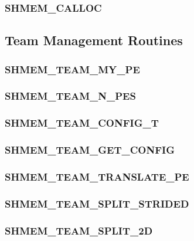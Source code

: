 \documentclass[10pt]{book}
\begin{document}
\subsubsection{\textbf{SHMEM\_CALLOC}}\label{subsec:shmem_calloc}




\subsection{Team Management Routines}\label{subsec:team}


\subsubsection{\textbf{SHMEM\_TEAM\_MY\_PE}}\label{subsec:shmem_team_my_pe}


\subsubsection{\textbf{SHMEM\_TEAM\_N\_PES}}\label{subsec:shmem_team_n_pes}


\subsubsection{\textbf{SHMEM\_TEAM\_CONFIG\_T}}
\label{subsec:shmem_team_config_t}


\subsubsection{\textbf{SHMEM\_TEAM\_GET\_CONFIG}}\label{subsec:shmem_team_get_config}


\subsubsection{\textbf{SHMEM\_TEAM\_TRANSLATE\_PE}}\label{subsec:shmem_team_translate_pe}


\subsubsection{\textbf{SHMEM\_TEAM\_SPLIT\_STRIDED}}\label{subsec:shmem_team_split_strided}


\subsubsection{\textbf{SHMEM\_TEAM\_SPLIT\_2D}}\label{subsec:shmem_team_split_2d}

\end{document}
